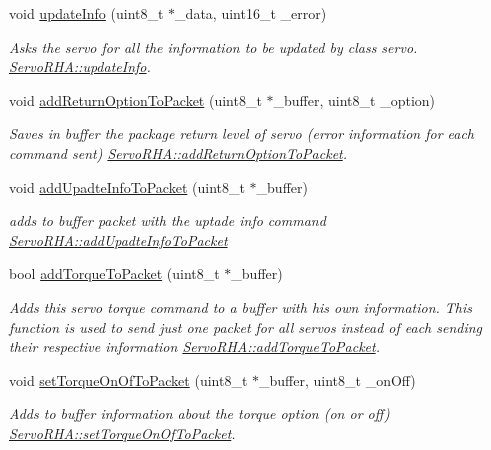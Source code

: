\begin{DoxyCompactItemize}
\item 
void \hyperlink{classServoRHA_a43b5aa2533b9b1c111ed3b39ac64e894}{update\+Info} (uint8\+\_\+t $\ast$\+\_\+data, uint16\+\_\+t \+\_\+error)
\begin{DoxyCompactList}\small\item\em Asks the servo for all the information to be updated by class servo.  \hyperlink{classServoRHA_a43b5aa2533b9b1c111ed3b39ac64e894}{Servo\+R\+H\+A\+::update\+Info}. \end{DoxyCompactList}\item 
void \hyperlink{classServoRHA_afefa8eadfa7e5e8d001141860fceb0ad}{add\+Return\+Option\+To\+Packet} (uint8\+\_\+t $\ast$\+\_\+buffer, uint8\+\_\+t \+\_\+option)
\begin{DoxyCompactList}\small\item\em Saves in buffer the package return level of servo (error information for each command sent)  \hyperlink{classServoRHA_afefa8eadfa7e5e8d001141860fceb0ad}{Servo\+R\+H\+A\+::add\+Return\+Option\+To\+Packet}. \end{DoxyCompactList}\item 
void \hyperlink{classServoRHA_a57d3a8473a7231b1107d0a69f326dff0}{add\+Upadte\+Info\+To\+Packet} (uint8\+\_\+t $\ast$\+\_\+buffer)
\begin{DoxyCompactList}\small\item\em adds to buffer packet with the uptade info command  \hyperlink{classServoRHA_a57d3a8473a7231b1107d0a69f326dff0}{Servo\+R\+H\+A\+::add\+Upadte\+Info\+To\+Packet} \end{DoxyCompactList}\item 
bool \hyperlink{classServoRHA_a9863a42851b9337cff6b9264cbd457b1}{add\+Torque\+To\+Packet} (uint8\+\_\+t $\ast$\+\_\+buffer)
\begin{DoxyCompactList}\small\item\em Adds this servo torque command to a buffer with his own information. This function is used to send just one packet for all servos instead of each sending their respective information  \hyperlink{classServoRHA_a9863a42851b9337cff6b9264cbd457b1}{Servo\+R\+H\+A\+::add\+Torque\+To\+Packet}. \end{DoxyCompactList}\item 
void \hyperlink{classServoRHA_a80acc3b604abbd21cc4de67127fe34e2}{set\+Torque\+On\+Of\+To\+Packet} (uint8\+\_\+t $\ast$\+\_\+buffer, uint8\+\_\+t \+\_\+on\+Off)
\begin{DoxyCompactList}\small\item\em Adds to buffer information about the torque option (on or off)  \hyperlink{classServoRHA_a80acc3b604abbd21cc4de67127fe34e2}{Servo\+R\+H\+A\+::set\+Torque\+On\+Of\+To\+Packet}. \end{DoxyCompactList}\item 

\end{DoxyCompactItemize}
